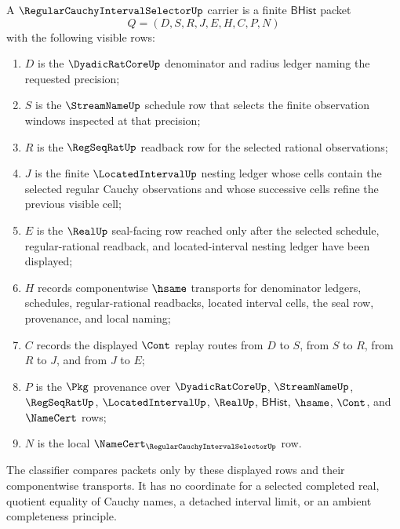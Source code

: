 \begin{definition}
\label{def:regular-cauchy-interval-selector-carrier}
A $\RegularCauchyIntervalSelectorUp$ carrier is a finite $\mathsf{BHist}$ packet
$$
Q=(D,S,R,J,E,H,C,P,N)
$$
with the following visible rows:
\begin{enumerate}
\item $D$ is the $\DyadicRatCoreUp$ denominator and radius ledger naming the requested precision;
\item $S$ is the $\StreamNameUp$ schedule row that selects the finite observation windows inspected at that precision;
\item $R$ is the $\RegSeqRatUp$ readback row for the selected rational observations;
\item $J$ is the finite $\LocatedIntervalUp$ nesting ledger whose cells contain the selected regular Cauchy observations and whose successive cells refine the previous visible cell;
\item $E$ is the $\RealUp$ seal-facing row reached only after the selected schedule, regular-rational readback, and located-interval nesting ledger have been displayed;
\item $H$ records componentwise $\hsame$ transports for denominator ledgers, schedules, regular-rational readbacks, located interval cells, the seal row, provenance, and local naming;
\item $C$ records the displayed $\Cont$ replay routes from $D$ to $S$, from $S$ to $R$, from $R$ to $J$, and from $J$ to $E$;
\item $P$ is the $\Pkg$ provenance over $\DyadicRatCoreUp$, $\StreamNameUp$, $\RegSeqRatUp$, $\LocatedIntervalUp$, $\RealUp$, $\mathsf{BHist}$, $\hsame$, $\Cont$, and $\NameCert$ rows;
\item $N$ is the local $\NameCert_{\RegularCauchyIntervalSelectorUp}$ row.
\end{enumerate}
The classifier compares packets only by these displayed rows and their componentwise transports. It has no coordinate for a selected completed real, quotient equality of Cauchy names, a detached interval limit, or an ambient completeness principle.
\end{definition}

